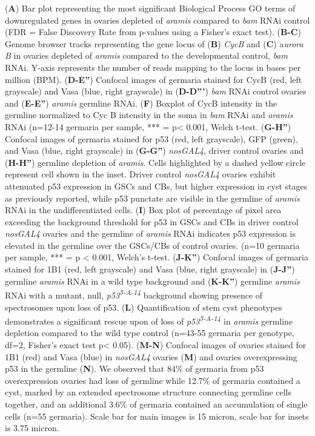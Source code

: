 \documentclass[12pt,oneside]{reedthesis}
\begin{document}
(\textbf{A}) Bar plot representing the
most significant Biological Process GO terms of downregulated genes in
ovaries depleted of \emph{aramis} compared to \emph{bam} RNAi control (FDR = False
Discovery Rate from p-values using a Fisher's exact test). (\textbf{B-C})
Genome browser tracks representing the gene locus of (\textbf{B}) \emph{CycB} and
(\textbf{C}) a\emph{urora B} in ovaries depleted of \emph{aramis} compared to the
developmental control, \emph{bam} RNAi. Y-axis represents the number of reads
mapping to the locus in bases per million (BPM). (\textbf{D-E''}) Confocal
images of germaria stained for CycB (red, left grayscale) and Vasa
(blue, right grayscale) in (\textbf{D-D'''}) \emph{bam} RNAi control ovaries and
(\textbf{E-E''}) \emph{aramis} germline RNAi. (\textbf{F}) Boxplot of CycB intensity in
the germline normalized to Cyc B intensity in the soma in \emph{bam} RNAi and
\emph{aramis} RNAi (n=12-14 germaria per sample, *** = p\textless{} 0.001, Welch
t-test. (\textbf{G-H''}) Confocal images of germaria stained for p53 (red,
left grayscale), GFP (green), and Vasa (blue, right grayscale) in
(\textbf{G-G''}) \emph{nosGAL4}, driver control ovaries and (\textbf{H-H''}) germline
depletion of \emph{aramis}. Cells highlighted by a dashed yellow circle
represent cell shown in the inset. Driver control \emph{nosGAL4} ovaries
exhibit attenuated p53 expression in GSCs and CBs, but higher expression
in cyst stages as previously reported, while p53 punctate are visible in
the germline of \emph{aramis} RNAi in the undifferentiated cells. (\textbf{I}) Box
plot of percentage of pixel area exceeding the background threshold for
p53 in GSCs and CBs in driver control \emph{nosGAL4} ovaries and the germline
of \emph{aramis} RNAi indicates p53 expression is elevated in the germline
over the GSCs/CBs of control ovaries. (n=10 germaria per sample, ***
= p \textless{} 0.001, Welch's t-test. (\textbf{J-K''}) Confocal images of germaria
stained for 1B1 (red, left grayscale) and Vasa (blue, right grayscale)
in (\textbf{J-J''}) germline \emph{aramis} RNAi in a wild type background and
(\textbf{K-K''}) germline \emph{aramis} RNAi with a mutant, null, \emph{p53\textsuperscript{5-A-14}}
background showing presence of spectrosomes upon loss of p53. (\textbf{L})
Quantification of stem cyst phenotypes demonstrates a significant rescue
upon of loss of \emph{p53\textsuperscript{5-A-14}} in \emph{aramis} germline depletion compared to
the wild type control (n=43-55 germaria per genotype, df=2, Fisher's
exact test p\textless{} 0.05). (\textbf{M-N}) Confocal images of ovaries stained for
1B1 (red) and Vasa (blue) in \emph{nosGAL4} ovaries (\textbf{M}) and ovaries
overexpressing p53 in the germline (\textbf{N}). We observed that 84\% of
germaria from p53 overexpression ovaries had loss of germline while
12.7\% of germaria contained a cyst, marked by an extended spectrosome
structure connecting germline cells together, and an additional 3.6\% of
germaria contained an accumulation of single cells (n=55 germaria).
Scale bar for main images is 15 micron, scale bar for insets is 3.75
micron.
\end{document}
